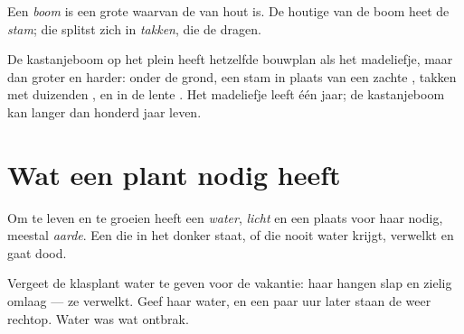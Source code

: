 \begin{definition}[Boom]\label{def:g1:plants-around-us:tree}
Een \emph{boom} is een grote  waarvan de  van
hout is. De houtige  van de boom heet de
\emph{stam}; die splitst zich in \emph{takken},
die de  dragen.
\end{definition}

\begin{example}[De kastanjeboom]\label{ex:g1:plants-around-us:tree}
De kastanjeboom op het plein heeft hetzelfde bouwplan als het
madeliefje, maar dan groter en harder:  onder de grond, een stam
in plaats van een zachte , takken met duizenden , en in
de lente . Het madeliefje leeft één jaar; de kastanjeboom kan
langer dan honderd jaar leven.
\end{example}

\section{Wat een plant nodig heeft}

\begin{proposition}\label{prop:g1:plants-around-us:needs}
Om te leven en te groeien heeft een  \emph{water}, \emph{licht} en
een plaats voor haar  nodig, meestal \emph{aarde}.
Een  die in het donker staat, of die nooit water krijgt, verwelkt
en gaat dood.
\end{proposition}
\admitted

\begin{example}\label{ex:g1:plants-around-us:wilt}
Vergeet de klasplant water te geven voor de vakantie: haar 
hangen slap en zielig omlaag --- ze verwelkt. Geef haar water, en een
paar uur later staan de  weer rechtop. Water was wat ontbrak.
\end{example}

